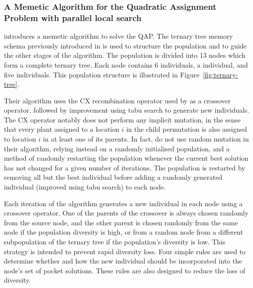 {    %


    \subsubsection*{A Memetic Algorithm for the Quadratic Assignment Problem with parallel local search} {
        \citet{Harris:2015kw} introduces a memetic algorithm to solve the QAP.
        The ternary tree memory schema previously introduced in \citet{Inostroza:2008md} is used to structure the population and to guide the other stages of the algorithm.
        The population is divided into 13 nodes which form a complete ternary tree. Each node contains 6 individuals, a  individual, and five  individuals.
        This population structure is illustrated in Figure~\ref{fig:ternary-tree}.

    	Their algorithm uses the CX recombination operator used by \citet{Merz:2000ek} as a crossover operator, followed by improvement using tabu search to generate new individuals.
    	The CX operator notably does not perform any implicit mutation, in the sense that every plant assigned to a location \(i\) in the child permutation is also assigned to location \(i\) in at least one of its parents.
    	In fact, \citeauthor{Harris:2015kw} do not use random mutation in their algorithm, relying instead on a randomly initialised population, and a method of randomly restarting the population whenever the current best solution has not changed for a given number of iterations. The population is restarted by removing all but the best individual before adding a randomly generated individual (improved using tabu search) to each node.

    	Each iteration of the algorithm generates a new individual in each node using a crossover operator. One of the parents of the crossover is always chosen randomly from the source node, and the other parent is chosen randomly from the same node if the population diversity is high, or from a random node from a different subpopulation of the ternary tree if the population's diversity is low. This strategy is intended to prevent rapid diversity loss. Four simple rules are used to determine whether and how the new individual should be incorporated into the node's set of pocket solutions. These rules are also designed to reduce the loss of diversity.

}}

